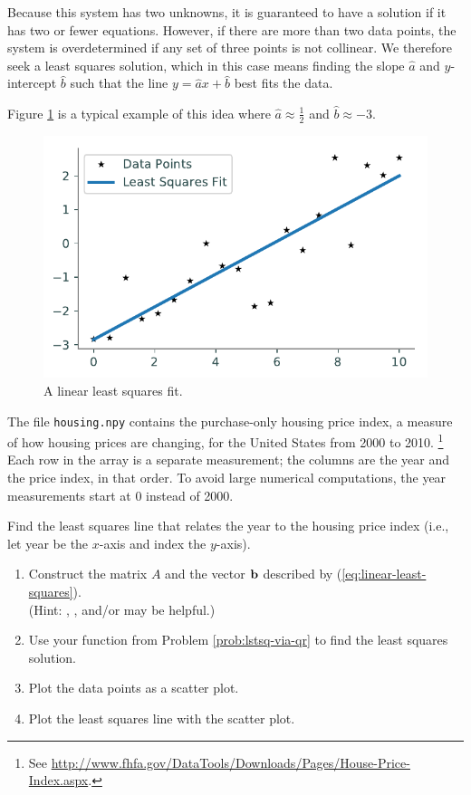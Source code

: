 Because this system has two unknowns, it is guaranteed to have a solution if it has two or fewer equations.
However, if there are more than two data points, the system is overdetermined if any set of three points is not collinear.
We therefore seek a least squares solution, which in this case means finding the slope $\widehat{a}$ and $y$-intercept $\widehat{b}$ such that the line $y = \widehat{a}x+\widehat{b}$ best fits the data.

Figure \ref{fig:line-fit-example} is a typical example of this idea where $\widehat{a} \approx \frac{1}{2}$ and $\widehat{b} \approx -3$.

\begin{figure}[H] %
    \includegraphics[width=.7\textwidth]{figures/line_fit_example.pdf}
    \caption{A linear least squares fit.}
    \label{fig:line-fit-example}
\end{figure}

\begin{problem}
The file \texttt{housing.npy} contains the purchase-only housing price index, a measure of how housing prices are changing, for the United States from 2000 to 2010.%
\footnote{See \url{http://www.fhfa.gov/DataTools/Downloads/Pages/House-Price-Index.aspx}.}
Each row in the array is a separate measurement; the columns are the year and the price index, in that order.
To avoid large numerical computations, the year measurements start at 0 instead of 2000.

Find the least squares line that relates the year to the housing price index (i.e., let year be the $x$-axis and index the $y$-axis).

\begin{enumerate}
    \item Construct the matrix $A$ and the vector $\mathbf{b}$ described by (\ref{eq:linear-least-squares}).\\
    (Hint: , , and/or  may be helpful.)
    \item Use your function from Problem \ref{prob:lstsq-via-qr} to find the least squares solution.
    \item Plot the data points as a scatter plot.
    \item Plot the least squares line with the scatter plot.\\
\end{enumerate}
\end{problem}

